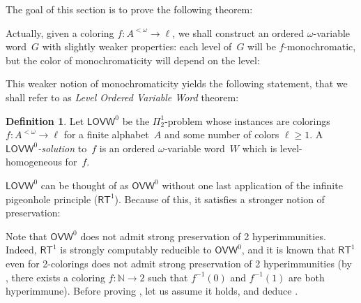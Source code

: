 \documentclass{article}
\def\msf{\mathsf}
\def\sectionallymonochromatic{level-homogeneous}
\newcommand{\RT}[0]{\mathsf{RT}}
\newcommand{\OVW}[0]{\mathsf{OVW}}
\newcommand{\LOVW}[0]{\mathsf{LOVW}}
\newcommand{\NN}[0]{\mathbb{N}}
\newcommand{\WSub}{\mathsf{WSub}}
\newtheorem{theorem}{Theorem}
\numberwithin{theorem}{section}
\theoremstyle{definition}
\newtheorem{definition}[theorem]{Definition}
\begin{document}
The goal of this section is to prove the following theorem:


Actually, given a coloring $f: A^{<\omega}\rightarrow\ell$, we shall construct an ordered $\omega$-variable word~$G$ with slightly weaker properties: each level of~$G$ will be $f$-monochromatic, but the color of monochromaticity will depend on the level:


This weaker notion of monochromaticity yields the following statement, that we shall refer to as \emph{Level Ordered Variable Word} theorem:

\begin{definition}
Let $\LOVW^0$ be the $\Pi^1_2$-problem whose instances are colorings $f : A^{<\omega} \to \ell$ for a finite alphabet~$A$ and some number of colors $\ell \geq 1$. A \emph{$\LOVW^0$-solution} to~$f$ is an ordered $\omega$-variable word~$W$ which is level-homogeneous for~$f$.
\end{definition}

$\LOVW^0$ can be thought of as $\OVW^0$ without one last application of the infinite pigeonhole principle ($\RT^1$). Because of this, it satisfies a stronger notion of preservation:


Note that $\OVW^0$ does not admit strong preservation of 2 hyperimmunities. Indeed, $\RT^1$ is strongly computably reducible to $\OVW^0$, and it is known that $\RT^1$ even for 2-colorings does not admit strong preservation of 2 hyperimmunities (by \cite[Theorem 5.2]{jockusch1968semirecursive}, there exists a coloring $f : \NN \to 2$ such that $f^{-1}(0)$ and $f^{-1}(1)$ are both hyperimmune).
Before proving , let us assume it holds, and deduce .
\end{document}
